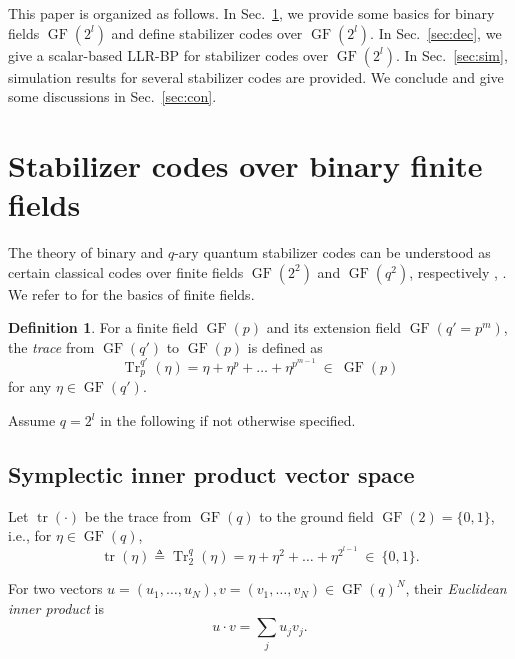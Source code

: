 \documentclass{ieeeaccess}
\DeclareMathOperator{\GF}{GF}
\DeclareMathOperator{\tr}{tr}
\DeclareMathOperator{\Tr}{Tr}
\let\emph\textit
\theoremstyle{definition}		%
\newtheorem{definition}{Definition}
\begin{document}
This paper is organized as follows. In Sec.~\ref{sec:stb}, we provide some basics for binary fields $\GF(2^l)$ and define stabilizer codes over $\GF(2^l)$.
In Sec.~\ref{sec:dec}, we  give a scalar-based \mbox{LLR-BP} for   stabilizer codes over $\GF(2^l)$. 
In Sec.~\ref{sec:sim}, simulation results for several stabilizer codes are provided. 
We conclude and give some discussions in Sec.~\ref{sec:con}.


\section{Stabilizer codes over binary finite fields} \label{sec:stb}


The theory of binary and $q$-ary quantum stabilizer codes can be understood as certain classical codes over finite fields $\GF(2^2)$ and $\GF(q^2)$, respectively \cite{Shor95,CS96,Steane96,GotPhD,CRSS98,NC00}, \cite{Kni96a,Kni96b,Rai99,MU00,AK01,KKKS06}. 
%
We refer to \cite{McE87} for the basics of finite fields.



\begin{definition} \label{def:Tr}
	For a finite field $\GF(p)$ and its extension field \mbox{$\GF(q'={p}^m)$}, the \emph{trace}   from $\GF(q')$ to $\GF(p)$ is defined as
	\begin{equation*}
	\Tr^{q'}_{p}(\eta) = \eta + \eta^p + \dots + \eta^{{p}^{m-1}} ~\in~ \GF(p)
	\end{equation*}
	for any $\eta\in\GF(q')$. 
\end{definition}



Assume $q=2^l$ in the following if not otherwise specified.


\subsection{Symplectic inner product  vector space} \label{sec:GF2_ext}


Let $\tr(\cdot)$ be the trace from $\GF(q)$ to the ground field $\GF(2) = \{0,1\}$, i.e., for  $\eta\in\GF(q)$,
	\begin{equation*}
	\tr(\eta) \triangleq \Tr^q_2(\eta) = \eta + \eta^2 + \dots + \eta^{2^{l-1}} ~\in~ \{0,1\}.
	\end{equation*}

For two vectors $u=(u_1,\dots,u_N),v=(v_1,\dots,v_N)\in\GF(q)^N$, their \emph{Euclidean inner product} is
$$u\cdot v = \textstyle \sum_{j} u_j v_j.$$
\end{document}
